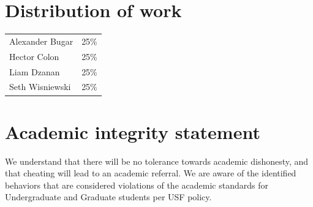 \documentclass[11pt,letterpaper]{article}
\begin{document}
\section*{Distribution of work}
\begin{tabular}{@{}ll@{}}
Alexander Bugar & 25\%\\
Hector Colon & 25\%\\
Liam Dzanan & 25\%\\
Seth Wisniewski & 25\%
\end{tabular}

\section*{Academic integrity statement}
We understand that there will be no tolerance towards academic dishonesty, and that cheating will lead to an academic referral. We are aware of the identified behaviors that are considered violations of the academic standards for Undergraduate and Graduate students per USF policy.
\end{document}
